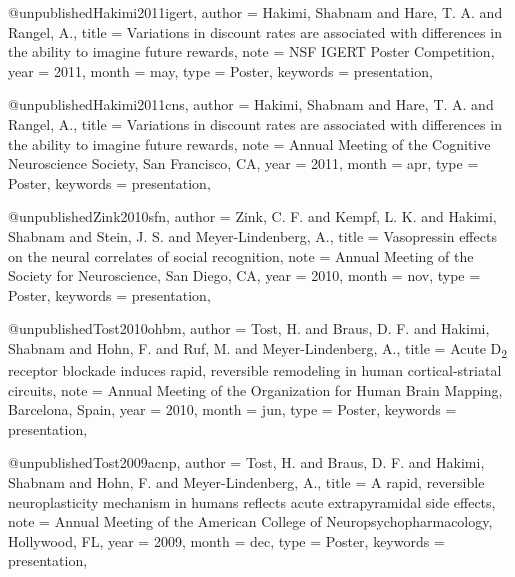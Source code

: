 @unpublished{Hakimi2011igert,
  author   = {Hakimi, Shabnam and Hare, T. A. and Rangel, A.},
  title    = {Variations in discount rates are associated with differences
              in the ability to imagine future rewards},
  note     = {NSF IGERT Poster Competition},
  year     = {2011},
  month    = may,
  type     = {Poster},
  keywords = {presentation},
}

@unpublished{Hakimi2011cns,
  author   = {Hakimi, Shabnam and Hare, T. A. and Rangel, A.},
  title    = {Variations in discount rates are associated with differences
              in the ability to imagine future rewards},
  note     = {Annual Meeting of the Cognitive Neuroscience Society,
              San Francisco, CA},
  year     = {2011},
  month    = apr,
  type     = {Poster},
  keywords = {presentation},
}


@unpublished{Zink2010sfn,
  author   = {Zink, C. F. and Kempf, L. K. and Hakimi, Shabnam
              and Stein, J. S. and Meyer-Lindenberg, A.},
  title    = {Vasopressin effects on the neural correlates of social
              recognition},
  note     = {Annual Meeting of the Society for Neuroscience,
              San Diego, CA},
  year     = {2010},
  month    = nov,
  type     = {Poster},
  keywords = {presentation},
}

@unpublished{Tost2010ohbm,
  author   = {Tost, H. and Braus, D. F. and Hakimi, Shabnam
              and Hohn, F. and Ruf, M. and Meyer-Lindenberg, A.},
  title    = {Acute {D\textsubscript{2}} receptor blockade induces rapid,
              reversible remodeling in human cortical-striatal circuits},
  note     = {Annual Meeting of the Organization for Human Brain Mapping,
              Barcelona, Spain},
  year     = {2010},
  month    = jun,
  type     = {Poster},
  keywords = {presentation},
}


@unpublished{Tost2009acnp,
  author   = {Tost, H. and Braus, D. F. and Hakimi, Shabnam
              and Hohn, F. and Meyer-Lindenberg, A.},
  title    = {A rapid, reversible neuroplasticity mechanism in humans
              reflects acute extrapyramidal side effects},
  note     = {Annual Meeting of the American College of
              Neuropsychopharmacology, Hollywood, FL},
  year     = {2009},
  month    = dec,
  type     = {Poster},
  keywords = {presentation},
}

